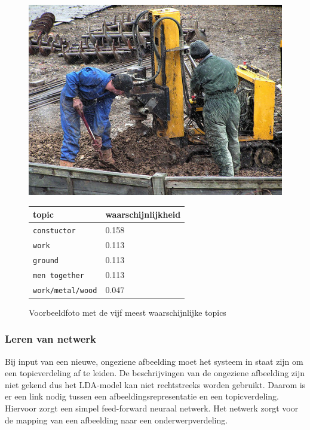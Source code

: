 \begin{figure}[h]
	\centering
	\begin{minipage}[t]{.5\linewidth}
		\centering
		\vspace{0pt}
		\includegraphics[width=\textwidth]{Images/LDA/5402085.jpg}
	\end{minipage}\hfill
	\begin{minipage}[t]{.5\textwidth}
		\centering
		\vspace{0pt}
		\begin{tabular}{ll}
			topic                           & waarschijnlijkheid\\
			\hline
			\texttt{constuctor}             & 0.158 \\
			\texttt{work}                   & 0.113 \\
			\texttt{ground}                 & 0.113 \\
			\texttt{men together}           & 0.113 \\
			\texttt{work/metal/wood}        & 0.047\\
			\hline
		\end{tabular}
	\end{minipage}
	\caption{Voorbeeldfoto met de vijf meest waarschijnlijke topics}
	\label{fig:ldatopics}
\end{figure}

\subsubsection{Leren van netwerk}
\label{sec:LDAprediction}
Bij input van een nieuwe, ongeziene afbeelding moet het systeem in staat zijn om een topicverdeling af te leiden. De beschrijvingen van de ongeziene afbeelding zijn niet gekend dus het LDA-model kan niet rechtstreeks worden gebruikt. Daarom is er een link nodig tussen een afbeeldingsrepresentatie en een topicverdeling. Hiervoor zorgt een simpel feed-forward neuraal netwerk. 
Het netwerk zorgt voor de mapping van een afbeelding naar een onderwerpverdeling.

